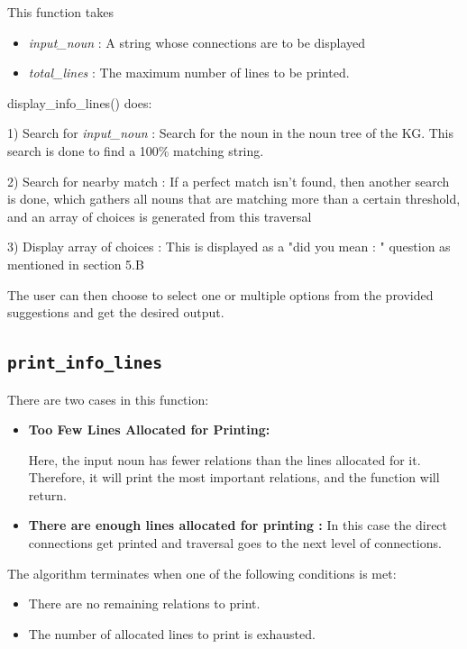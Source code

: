 \documentclass[conference]{IEEEtran}
\begin{document}
This function takes
\begin{itemize}
\item \textit{input\_noun} : A string whose connections are to be displayed
\item \textit{total\_lines} : The maximum number of lines to be printed. 
\end{itemize}


display\_info\_lines() does:

1) Search for \textit{input\_noun} : Search for the noun in the noun tree of the KG. This search is done to find a 100\% matching string.

2) Search for nearby match : If a perfect match isn't found, then another search is done, which gathers all nouns that are matching more than a certain threshold, and an array of choices is generated from this traversal


3) Display array of choices : This is displayed as a "did you mean : " question as mentioned in section  \romannumeral5.B


The user can then choose to select one or multiple options from the provided suggestions and get the desired output.


\subsection{\textbf{\texttt{print\_info\_lines}}}
There are two cases in this function:

\begin{itemize}
    \item \textbf{Too Few Lines Allocated for Printing:}
    
    Here, the input noun has fewer relations than the lines allocated for it. Therefore, it will print the most important relations, and the function will return. 
 
    
\item \textbf{There are enough lines allocated for printing :}
In this case the direct connections get printed and traversal goes to the next level of connections.
\end{itemize}
The algorithm terminates when one of the following conditions is met:
    \begin{itemize}
        \item There are no remaining relations to print.
        \item The number of allocated lines to print is exhausted.
    \end{itemize}
\end{document}
